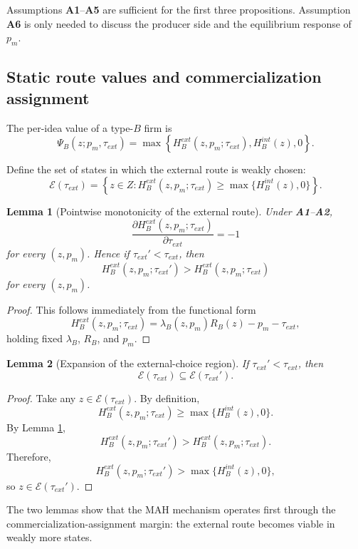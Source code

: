 \documentclass[12pt]{article}
\newtheorem{lemma}{Lemma}
\begin{document}
Assumptions \textbf{A1}--\textbf{A5} are sufficient for the first three propositions. Assumption \textbf{A6} is only needed to discuss the producer side and the equilibrium response of \(p_m\).

\subsection{Static route values and commercialization assignment}

The per-idea value of a type-\(B\) firm is
\[
\Psi_B(z;p_m,\tau_{ext})
=
\max\left\{
H_B^{ext}(z,p_m;\tau_{ext}),
H_B^{int}(z),
0
\right\}.
\]

Define the set of states in which the external route is weakly chosen:
\[
\mathcal{E}(\tau_{ext})
=
\left\{
z\in Z:
H_B^{ext}(z,p_m;\tau_{ext})
\ge
\max\{H_B^{int}(z),0\}
\right\}.
\]

\begin{lemma}[Pointwise monotonicity of the external route]
\label{lem:pointwise}
Under \textbf{A1}--\textbf{A2},
\[
\frac{\partial H_B^{ext}(z,p_m;\tau_{ext})}{\partial \tau_{ext}}=-1
\]
for every \((z,p_m)\). Hence if \(\tau_{ext}'<\tau_{ext}\), then
\[
H_B^{ext}(z,p_m;\tau_{ext}')>H_B^{ext}(z,p_m;\tau_{ext})
\]
for every \((z,p_m)\).
\end{lemma}

\begin{proof}
This follows immediately from the functional form
\[
H_B^{ext}(z,p_m;\tau_{ext})
=
\lambda_B(z,p_m)R_B(z)-p_m-\tau_{ext},
\]
holding fixed \(\lambda_B\), \(R_B\), and \(p_m\).
\end{proof}

\begin{lemma}[Expansion of the external-choice region]
\label{lem:expand}
If \(\tau_{ext}'<\tau_{ext}\), then
\[
\mathcal{E}(\tau_{ext})\subseteq \mathcal{E}(\tau_{ext}').
\]
\end{lemma}

\begin{proof}
Take any \(z\in \mathcal{E}(\tau_{ext})\). By definition,
\[
H_B^{ext}(z,p_m;\tau_{ext})
\ge
\max\{H_B^{int}(z),0\}.
\]
By Lemma \ref{lem:pointwise},
\[
H_B^{ext}(z,p_m;\tau_{ext}')
>
H_B^{ext}(z,p_m;\tau_{ext}).
\]
Therefore,
\[
H_B^{ext}(z,p_m;\tau_{ext}')
>
\max\{H_B^{int}(z),0\},
\]
so \(z\in \mathcal{E}(\tau_{ext}')\).
\end{proof}

The two lemmas show that the MAH mechanism operates first through the commercialization-assignment margin: the external route becomes viable in weakly more states.
\end{document}
